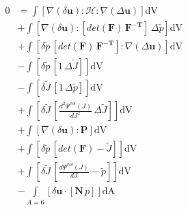 \documentclass[preview,varwidth,multi,border=1pt]{standalone}
\begin{document}
\preview
$\begin{aligned}
0 &= \int\left[\nabla\left(\delta{\mathbf{u}}\right) \colon \mathcal{\mathcal{H}} \colon \nabla\left(\Delta{\mathbf{u}}\right)\right]\textrm{dV} \\
  &+ \int\left[\nabla\left(\delta{\mathbf{u}}\right) \colon \left[{det(\mathbf{F})}\,\mathbf{\mathbf{F}^{-T}}\right]\,\Delta{\tilde{p}}\right]\textrm{dV} \\
  &+ \int\left[\delta{\tilde{p}}\,\left[{det(\mathbf{F})}\,\mathbf{\mathbf{F}^{-T}}\right] \colon \nabla\left(\Delta{\mathbf{u}}\right)\right]\textrm{dV} \\
  &- \int\left[\delta{\tilde{p}}\,\left[{1}\,\Delta{\tilde{J}}\right]\right]\textrm{dV} \\
  &- \int\left[\delta{\tilde{J}}\,\left[{1}\,\Delta{\tilde{p}}\right]\right]\textrm{dV} \\
  &+ \int\left[\delta{\tilde{J}}\,\left[{\frac{d^{2} \Psi^{vol}(J)}{dJ^{2}}}\,\Delta{\tilde{J}}\right]\right]\textrm{dV} \\
  &+ \int\left[\nabla\left(\delta{\mathbf{u}}\right) \colon \mathbf{\mathbf{P}}\right]\textrm{dV} \\
  &+ \int\left[\delta{\tilde{p}}\,\left[{det(\mathbf{F})} - {\tilde{J}}\right]\right]\textrm{dV} \\
  &+ \int\left[\delta{\tilde{J}}\,\left[{\frac{d \Psi^{vol}(J)}{dJ}} - {\tilde{p}}\right]\right]\textrm{dV} \\
  &- \int\limits_{A=6}\left[\delta{\mathbf{u}} \cdot \left[\mathbf{N}\,{p}\right]\right]\textrm{dA}
\end{aligned}$
\endpreview

\newpage
\end{document}
